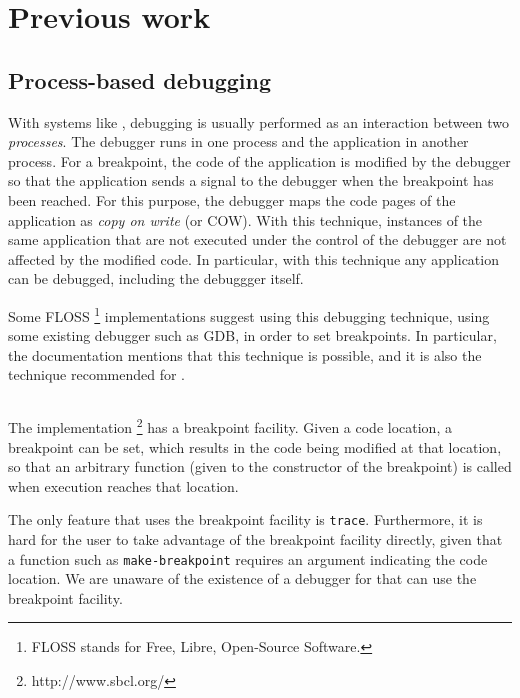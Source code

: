 \section{Previous work}

\subsection{Process-based debugging}

With systems like \unix{}, debugging is usually performed as an
interaction between two \emph{processes}.  The debugger runs in one
process and the application in another process.  For a breakpoint, the
code of the application is modified by the debugger so that the
application sends a signal to the debugger when the breakpoint has
been reached.  For this purpose, the debugger maps the code pages of
the application as \emph{copy on write} (or COW).  With this
technique, instances of the same application that are not executed
under the control of the debugger are not affected by the modified
code.  In particular, with this technique any application can be
debugged, including the debuggger itself.

Some FLOSS%
\footnote{FLOSS stands for Free, Libre, Open-Source Software.}
\commonlisp{} implementations suggest using this debugging technique,
using some existing debugger such as GDB, in order to set breakpoints.
In particular, the \ccl{}  documentation
mentions that this technique is possible, and it is also the technique
recommended for \ecl{} .

\subsection{\sbcl{}}

The \sbcl{} \commonlisp{} implementation%
\footnote{http://www.sbcl.org/}
has a breakpoint facility.  Given a code location, a breakpoint can be
set, which results in the code being modified at that location, so
that an arbitrary function (given to the constructor of the
breakpoint) is called when execution reaches that location.

The only feature that uses the breakpoint facility is \texttt{trace}.
Furthermore, it is hard for the user to take advantage of the
breakpoint facility directly, given that a function such as
\texttt{make-breakpoint} requires an argument indicating the code
location.  We are unaware of the existence of a debugger for \sbcl{}
that can use the breakpoint facility.

